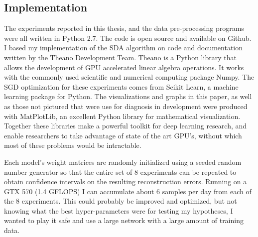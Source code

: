 \documentclass[12pt]{article}
\begin{document}
\begin{doublespacing}
	\subsection{Implementation} 
	The experiments reported in this thesis, and the data pre-processing programs were all written in Python 2.7. The code is open source and available on Github\cite{nifong13}.  I based my implementation of the SDA algorithm on code and documentation written by the Theano Development Team. Theano is a Python library that allows the development of GPU accelerated linear algebra operations. It works with the commonly used scientific and numerical computing package Numpy. The SGD optimization for these experiments comes from Scikit Learn, a machine learning package for Python. The visualizations and graphs in this paper, as well as those not pictured that were use for diagnosis in development were produced with MatPlotLib, an excellent Python library for mathematical visualization. Together these libraries make a powerful toolkit for deep learning research, and enable researchers to take advantage of state of the art GPU's, without which most of these problems would be intractable. 
	
	Each model's weight matrices are randomly initialized using a seeded random number generator so that the entire set of 8 experiments can be repeated to obtain confidence intervals on the resulting reconstruction errors. Running on a GTX 570 (1.4 GFLOPS) I can accumulate about 6 samples per day from each of the 8 experiments. This could probably be improved and optimized, but not knowing what the best hyper-parameters were for testing my hypotheses, I wanted to play it safe and use a large network with a large amount of training data. 


\end{doublespacing}
\end{document}
